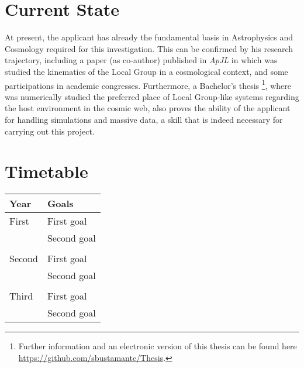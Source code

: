 \documentclass[a4,useAMS,usenatbib,usegraphicx,12pt]{article}
\begin{document}
\section{Current State}


At present, the applicant has already the fundamental basis in Astrophysics and
Cosmology required for this investigation. This can be confirmed by his research 
trajectory, including a paper (as co-author) published in \textit{ApJL} in which 
was studied the kinematics of the Local Group in a cosmological context, and some
participations in academic congresses. Furthermore, a Bachelor's thesis
\footnote{Further information and an electronic version of this 
thesis can be found here \url{https://github.com/sbustamante/Thesis}.}, where was 
numerically studied the preferred place of Local Group-like systems regarding the 
host environment in the cosmic web, also proves the ability of the applicant for
handling simulations and massive data, a skill that is indeed necessary for 
carrying out this project.


\section{Timetable}

\begin{table}[h]
\begin{flushleft}
\begin{center}
  \begin{tabular}{l  l} \hline\hline
	\centering\textbf{Year} & \textbf{Goals} \\ \hline
	First  
	& \tabitem First goal \\
	& \tabitem Second goal\\
	
	\\
	Second
	& \tabitem First goal \\
	& \tabitem Second goal\\

	\\	
	Third
	& \tabitem First goal \\
	& \tabitem Second goal\\ 
	
	\hline\hline
  \end{tabular}  
\end{center}
\end{flushleft}
\end{table}



\renewcommand{\bibname}{8\ \ \ \ Bibliography}

\end{document}
